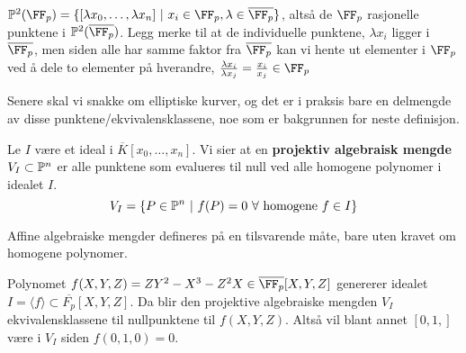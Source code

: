 \begin{eksempel}
$\Projective^2(\FF_p) = \{ [ \lambda x_0, \ldots, \lambda x_n] \text{ $|$ } x_i \in \FF_p, \lambda \in \overline{\FF_p} \}$, altså de $\FF_p$ rasjonelle punktene i $\Projective^2(\overline{\FF_p})$. Legg merke til at de individuelle punktene, $\lambda x_i$ ligger i $\overline{\FF_p}$, men siden alle har samme faktor fra $\overline{\FF_p}$ kan vi hente ut elementer i $\FF_p$ ved å dele to elementer på hverandre, $\frac{\lambda x_i}{\lambda x_j} = \frac{x_i}{x_j} \in \FF_p$
\end{eksempel}




Senere skal vi snakke om elliptiske kurver, og det er i praksis bare en delmengde av disse punktene/ekvivalensklassene, noe som er bakgrunnen for neste definisjon.

\begin{definisjon}
Le $I$ være et ideal i $\overline{K}[x_0, \ldots, x_n]$. Vi sier at en \textbf{projektiv algebraisk mengde} $V_I \subset \mathbb{P}^n$ er alle punktene som evalueres til null ved alle homogene polynomer i idealet $I$. $$V_I = \{P \in \mathbb{P}^n
 \text{ $|$ } f(P) = 0 \text{ } \forall \text{ homogene } f \in I \} $$
 \end{definisjon}
Affine algebraiske mengder defineres på en tilsvarende måte, bare uten kravet om homogene polynomer.

\begin{eksempel}
Polynomet $f(X,Y,Z) = ZY^2 - X^3 - Z^2X \in \overline{\FF_p}[X,Y,Z]$ genererer idealet $I = \langle f \rangle \subset \overline{F_p}[X,Y,Z]$. Da blir den projektive algebraiske mengden $V_I$ ekvivalensklassene til nullpunktene til $f(X,Y,Z)$. Altså vil blant annet $[0,1,]$ være i $V_I$ siden $f(0,1,0) = 0$. 
\end{eksempel}


